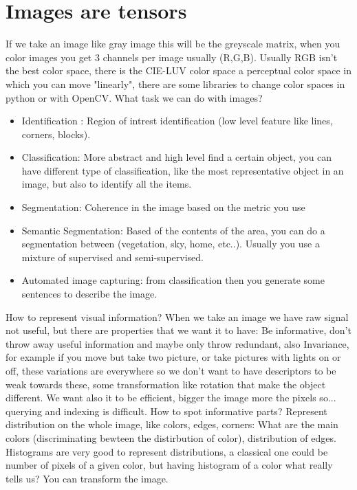 \documentclass[12pt]{book}
\begin{document}
\section{Images are tensors}
If we take an image like gray image this will be the greyscale matrix, when you color images you get 3 channels per image usually (R,G,B). Usually RGB isn't the best color space, there is the CIE-LUV color space a perceptual color space in which you can move "linearly", there are some libraries to change color spaces in python or with OpenCV.\newline
What task we can do with images? \newline
\begin{itemize}
	\item Identification : Region of intrest identification (low level feature like lines, corners, blocks).
	\item Classification: More abstract and high level find a certain object, you can have different type of classification, like the most representative object in an image, but also to identify all the items.
	\item Segmentation: Coherence in the image based on the metric you use
	\item Semantic Segmentation: Based of the contents of the area, you can do a segmentation between (vegetation, sky, home, etc..). Usually you use a mixture of supervised and semi-supervised.
	\item Automated image capturing: from classification then you generate some sentences to describe the image.
\end{itemize}
How to represent visual information? \newline\newline
When we take an image we have raw signal not useful, but there are properties that we want it to have: Be informative, don't throw away useful information and maybe only throw redundant, also Invariance, for example if you move but take two picture, or take pictures with lights on or off, these variations are everywhere so we don't want to have descriptors to be weak towards these, some transformation like rotation that make the object different.\newline
We want also it to be efficient, bigger the image more the pixels so... querying and indexing is difficult. \newline
How to spot informative parts? \newline
Represent distribution on the whole image, like colors, edges, corners: What are the main colors (discriminating bewteen the distirbution of color), distribution of edges.\newline
Histograms are very good to represent distributions, a classical one could be number of pixels of a given color, but having histogram of a color what really tells us? You can transform the image.
\end{document}
